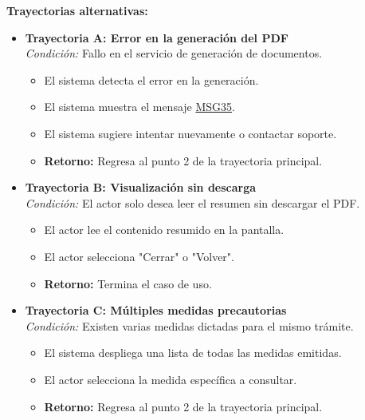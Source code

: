 \begin{appendices}
\textbf{Trayectorias alternativas:}
\begin{itemize}[leftmargin=*]
    \item \textbf{Trayectoria A: Error en la generación del PDF} \\
    \textit{Condición:} Fallo en el servicio de generación de documentos.
    \begin{itemize}[nosep]
        \item[A-1:] El sistema detecta el error en la generación.
        \item[A-2:] El sistema muestra el mensaje \hyperlink{msg:MSG35}{MSG35}.
        \item[A-3:] El sistema sugiere intentar nuevamente o contactar soporte.
        \item \textbf{Retorno:} Regresa al punto 2 de la trayectoria principal.
    \end{itemize}
    \item \textbf{Trayectoria B: Visualización sin descarga} \\
    \textit{Condición:} El actor solo desea leer el resumen sin descargar el PDF.
    \begin{itemize}[nosep]
        \item[B-1:] El actor lee el contenido resumido en la pantalla.
        \item[B-2:] El actor selecciona "Cerrar" o "Volver".
        \item \textbf{Retorno:} Termina el caso de uso.
    \end{itemize}
    \item \textbf{Trayectoria C: Múltiples medidas precautorias} \\
    \textit{Condición:} Existen varias medidas dictadas para el mismo trámite.
    \begin{itemize}[nosep]
        \item[C-1:] El sistema despliega una lista de todas las medidas emitidas.
        \item[C-2:] El actor selecciona la medida específica a consultar.
        \item \textbf{Retorno:} Regresa al punto 2 de la trayectoria principal.
    \end{itemize}
\end{itemize}

\newpage


\end{appendices}

